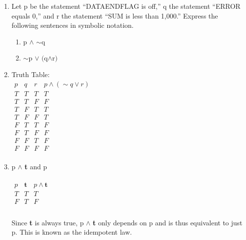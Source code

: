 \documentclass{article}
\makeatletter
\newcommand\setItemnumber[1]{\setcounter{enum\romannumeral\@enumdepth}{\numexpr#1-1\relax}}
\makeatother
\begin{document}
\begin{enumerate}
  \setItemnumber{10}
  \item Let p be the statement ``DATAENDFLAG is off,” q the statement ``ERROR equals 0,” and r the statement ``SUM is less than 1,000.” Express the following sentences in symbolic notation.
  \begin{enumerate}
      \setItemnumber{2}
      \item p $\land$ $\sim$q
      \setItemnumber{5}
      \item $\sim$p $\lor$ $($q$\land$r$)$
  \end{enumerate}
  \setItemnumber{15}
  \item Truth Table:\\
  \begin{math} 
  \begin{array}{|ccc|c|}
    p&q&r&p \land (\sim q \lor r) \\
    \hline
    T&T&T &T \\
    T&T&F &F\\
    T&F&T &T\\
    T&F&F &T\\
    F&T&T &F \\
    F&T&F &F\\
    F&F&T &F\\
    F&F&F &F\\
  \end{array}
  \end{math}
  \setItemnumber{19}
  \item p $\land$ \textbf{t} and p\\
  \\
  \begin{math} 
  \begin{array}{|cc|c|}
    p&\textbf{t}& p \land \textbf{t} \\
    \hline
    T&T &T \\
    F&T &F \\
  \end{array}
  \end{math}
  \\
  \\
  Since \textbf{t} is always true, p $\land$ \textbf{t} only depends on p and is thus equivalent to just p. This is known as the idempotent law.

\end{enumerate}
\end{document}

